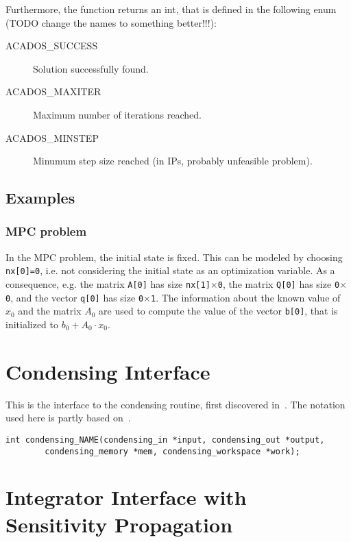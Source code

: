 \documentclass{report}
\begin{document}
Furthermore, the function returns an int, that is defined in the following enum (TODO change the names to something better!!!):
\begin{description}
\item[ACADOS\_SUCCESS] Solution successfully found.
\item[ACADOS\_MAXITER] Maximum number of iterations reached.
\item[ACADOS\_MINSTEP] Minumum step size reached (in IPs, probably unfeasible problem).
\end{description}

\subsection{Examples}

\subsubsection{MPC problem}

In the MPC problem, the initial state is fixed.
This can be modeled by choosing {\tt nx[0]=0}, i.e. not considering the initial state as an optimization variable.
As a consequence, e.g. the matrix {\tt A[0]} has size {\tt nx[1]$\times$0}, the matrix {\tt Q[0]} has size {\tt 0$\times$0}, and the vector {\tt q[0]} has size {\tt 0$\times$1}.
The information about the known value of $x_0$ and the matrix $A_0$ are used to compute the value of the vector {\tt b[0]}, that is initialized to $b_0 + A_0 \cdot x_0$.

\section{Condensing Interface}

This is the interface to the condensing routine, first discovered in~\cite{Bock1984}. The notation used here is partly based on~\cite{Frasch2014a}.

\begin{verbatim}
int condensing_NAME(condensing_in *input, condensing_out *output,
        condensing_memory *mem, condensing_workspace *work);
\end{verbatim}

\section{Integrator Interface with Sensitivity Propagation}
\end{document}
